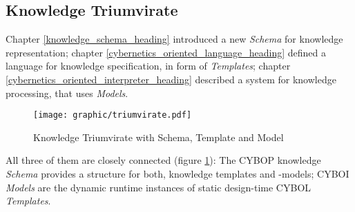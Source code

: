 %
%
%
%
%
%
%

\subsection{Knowledge Triumvirate}
\label{knowledge_triumvirate_heading}

Chapter \ref{knowledge_schema_heading} introduced a new \emph{Schema} for
knowledge representation; chapter \ref{cybernetics_oriented_language_heading}
defined a language for knowledge specification, in form of \emph{Templates};
chapter \ref{cybernetics_oriented_interpreter_heading} described a system for
knowledge processing, that uses \emph{Models}.

\begin{figure}[ht]
    \begin{center}
        \texttt{[image: graphic/triumvirate.pdf]}
        \caption{Knowledge Triumvirate with Schema, Template and Model}
        \label{triumvirate_figure}
    \end{center}
\end{figure}

All three of them are closely connected (figure \ref{triumvirate_figure}): The
CYBOP knowledge \emph{Schema} provides a structure for both, knowledge
templates and -models; CYBOI \emph{Models} are the dynamic runtime instances of
static design-time CYBOL \emph{Templates}.

